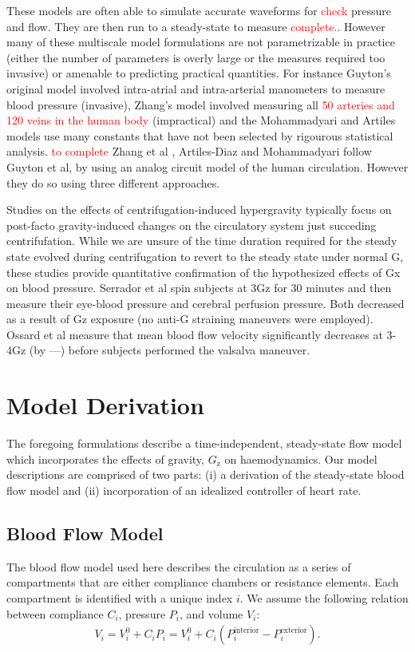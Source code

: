 \documentclass[12pt]{article}
\begin{document}
These models are often able to simulate accurate waveforms for \textcolor{red}{check} pressure and flow. They are then run to a steady-state to measure \textcolor{red}{complete.}. However many of these multiscale model formulations are not parametrizable in practice (either the number of parameters is overly large or the measures required too invasive) or amenable to predicting practical quantities. For instance Guyton's original model involved intra-atrial and intra-arterial manometers to measure blood pressure (invasive), Zhang's model involved measuring all \textcolor{red}{50 arteries and 120 veins in the human body} (impractical) and the Mohammadyari and Artiles models use many constants that have not been selected by rigourous statistical analysis.
\textcolor{red}{to complete}
Zhang et al \cite{zhang2017gravitational}, Artiles-Diaz \cite{diaz2019computational} and  Mohammadyari \cite{mohammadyari2021modelling} follow Guyton et al, by using an analog circuit model of the human circulation. However they do so using three different approaches.


Studies on the effects of centrifugation-induced hypergravity typically focus on post-facto gravity-induced changes on the circulatory system just succeding centrifufation. While we are unsure of the time duration required for the steady state evolved during centrifugation to revert to the steady state under normal G, these studies provide quantitative confirmation of the hypothesized effects of Gx on blood pressure. Serrador et al spin subjects at 3Gz for 30 minutes and then measure their eye-blood pressure and cerebral perfusion pressure. Both decreased as a result of Gz exposure (no anti-G straining maneuvers were employed).
Ossard et al \cite{ossard1996cerebral} measure that mean blood flow velocity significantly decreases at 3-4Gz (by ---) before subjects performed the valsalva maneuver.

\section{Model Derivation}
The foregoing formulations describe a time-independent, steady-state flow model which incorporates the effects of gravity, $G_\text{z}$ on haemodynamics. Our model descriptions are comprised of two parts: (i) a derivation of the steady-state blood flow model and (ii) incorporation of an idealized controller of heart rate.  

\subsection{Blood Flow Model}
The blood flow model used here describes the circulation as a series of compartments that are either compliance chambers or resistance elements. Each compartment is identified with a unique index $i$. We assume the following relation between compliance $C_i$, pressure $P_i$, and volume $V_i$:
\begin{align}
V_i = V^0_{i} + C_i P_i = V^0_{i} + C_i (P^{ \text{interior}}_i - P^{ \text{exterior}}_i).
\label{eq:comp_chamber}
\end{align}
\end{document}
